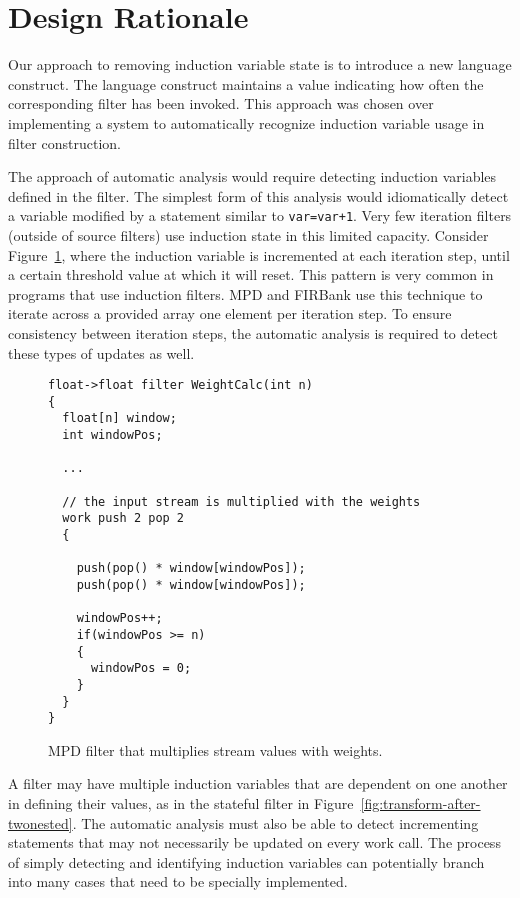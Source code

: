\section{Design Rationale}

Our approach to removing induction variable state is to introduce a new language construct.  The language construct maintains a value indicating how often the corresponding filter has been invoked.  This approach was chosen over implementing a system to automatically recognize induction variable usage in filter construction.

The approach of automatic analysis would require detecting induction variables defined in the filter.  The simplest form of this analysis would idiomatically detect a variable modified by a statement similar to \texttt{var=var+1}.  Very few iteration filters (outside of source filters) use induction state in this limited capacity.  Consider Figure~\ref{fig:weight-calc}, where the induction variable is incremented at each iteration step, until a certain threshold value at which it will reset.  This pattern is very common in programs that use induction filters.  MPD and FIRBank use this technique to iterate across a provided array one element per iteration step.  To ensure consistency between iteration steps, the automatic analysis is required to detect these types of updates as well.  

\begin{figure}[t]
{\eightpoint
\begin{verbatim}
float->float filter WeightCalc(int n)
{
  float[n] window;
  int windowPos;

  ...

  // the input stream is multiplied with the weights
  work push 2 pop 2
  {

    push(pop() * window[windowPos]);
    push(pop() * window[windowPos]);

    windowPos++;
    if(windowPos >= n)
    {
      windowPos = 0;
    }
  }
}
\end{verbatim}
\caption{MPD filter that multiplies stream values with weights.\protect\label{fig:weight-calc}}}
\end{figure}

A filter may have multiple induction variables that are dependent on one another in defining their values, as in the stateful filter in Figure~\ref{fig:transform-after-twonested}.  The automatic analysis must also be able to detect incrementing statements that may not necessarily be updated on every work call.  The process of simply detecting and identifying induction variables can potentially branch into many cases that need to be specially implemented.

